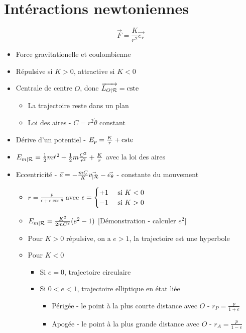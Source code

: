\documentclass[openany]{book}
\begin{document}
\section{Intéractions newtoniennes}
\[ \vec{F} = \frac{K}{r^2}\vec{e_r} \]
\begin{itemize}
    \item Force gravitationelle et coulombienne
    \item Répulsive si $K>0$, attractive si $K<0$
    \item Centrale de centre $O$, donc $\overrightarrow{L_{O|\mathcal{R}}} = \text{cste}$
    \begin{itemize}
        \item La trajectoire reste dans un plan
        \item Loi des aires - $C = r^2 \dot{\theta}$ constant
    \end{itemize}
    \item Dérive d'un potentiel - $E_p = \frac{K}{r} + \text{cste}$
    \item $E_{m|\mathcal{R}} = \frac{1}{2}m\dot{r}^2 + \frac{1}{2}m\frac{C^2}{r^2} + \frac{K}{r}$ avec la loi des aires
    \item Eccentricité - $\vec{e} = -\frac{mC}{K}\vec{v_{|\mathcal{R}}} - \vec{e_{\theta}}$ - constante du mouvement
    \begin{itemize}
        \item $r = \frac{p}{\epsilon + e\cos{\theta}}$ avec $\epsilon = \begin{cases}
            +1 & \text{ si } K<0 \\
            -1 & \text{ si } K>0 
        \end{cases}$
        \item $E_{m|\mathcal{R}} = \frac{K^2}{2mC^2}(e^2-1)$ [Démonstration - calculer $e^2$]
        \item Pour $K>0$ répulsive, on a $e>1$, la trajectoire est une hyperbole
        \item Pour $K<0$
        \begin{itemize}
            \item Si $e=0$, trajectoire circulaire
            \item Si $0<e<1$, trajectoire elliptique en état liée
            \begin{itemize}
                \item Périgée - le point à la plus courte distance avec $O$ - $r_P = \frac{p}{1+e}$
                \item Apogée - le point à la plus grande distance avec $O$ - $r_A = \frac{p}{1-e}$

\end{itemize}
\end{itemize}
\end{itemize}
\end{itemize}
\end{document}
